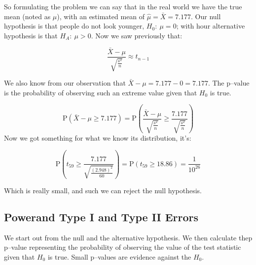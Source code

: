 So formulating the problem we can say that in the real world we have the true
mean (noted as $\mu$), with an estimated mean of $\hat{\mu}=\bar{X}=7.177$. Our
null hypothesis is that people do not look younger, $H_0:~\mu=0$; with hour
alternative hypothesis is that $H_A:~\mu>0$. Now we saw previously that:

\[ \frac{\bar{X}-\mu}{\sqrt{\frac{s^2}{n}}}  \approx t_{n-1}
\]

We also know from our observation that $\bar{X}-\mu=7.177-0=7.177$. The p--value
is the probability of observing such an extreme value given that $H_0$ is true.

\[ \mbox{P} \left( \bar{X} - \mu \geq 7.177\right) = 
\mbox{P} \left( \frac{\bar{X}-\mu}{\sqrt{\frac{s^2}{n}}} \geq
\frac{7.177}{\sqrt{\frac{s^2}{n}}}  \right)
\]
Now we got something for what we know its distribution, it's:

\[ \mbox{P} \left( t_{59} \geq \frac{7.177}{\sqrt{\frac{(2.948)^2}{60}}}\right)
= \mbox{P} \left( t_{59} \geq 18.86 \right) = \frac{1}{10^{26}}
\]

Which is really small, and such we can reject the null hypothesis.

\subsection{Powerand Type I and Type II Errors}

We start out from the null and the alternative hypothesis. We then calculate
thep p--value representing the probability of observing the value of the test
statistic given that $H_0$ is true. Small p--values are evidence against the
$H_0$.

